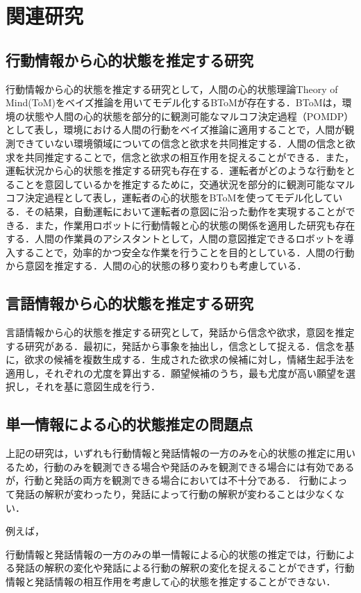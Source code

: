 \chapter{関連研究}
\section{行動情報から心的状態を推定する研究}
\par
行動情報から心的状態を推定する研究として，人間の心的状態理論Theory of Mind(ToM)をベイズ推論を用いてモデル化するBToM\cite{baker2011bayesian}が存在する．BToMは，環境の状態や人間の心的状態を部分的に観測可能なマルコフ決定過程（POMDP）として表し，環境における人間の行動をベイズ推論に適用することで，人間が観測できていない環境領域についての信念と欲求を共同推定する．人間の信念と欲求を共同推定することで，信念と欲求の相互作用を捉えることができる．また，運転状況から心的状態を推定する研究\cite{darwish2020learning}も存在する．運転者がどのような行動をとることを意図しているかを推定するために，交通状況を部分的に観測可能なマルコフ決定過程として表し，運転者の心的状態をBToMを使ってモデル化している．その結果，自動運転において運転者の意図に沿った動作を実現することができる．また，作業用ロボットに行動情報と心的状態の関係を適用した研究\cite{inbook}も存在する．人間の作業員のアシスタントとして，人間の意図推定できるロボットを導入することで，効率的かつ安全な作業を行うことを目的としている．人間の行動から意図を推定する．人間の心的状態の移り変わりも考慮している．

\section{言語情報から心的状態を推定する研究}
\par
言語情報から心的状態を推定する研究として，発話から信念や欲求，意図を推定する研究\cite{10.1007/978-3-642-02481-8_4}がある．最初に，発話から事象を抽出し，信念として捉える．信念を基に，欲求の候補を複数生成する．生成された欲求の候補に対し，情緒生起手法\cite{2002}を適用し，それぞれの尤度を算出する．願望候補のうち，最も尤度が高い願望を選択し，それを基に意図生成を行う．

\section{単一情報による心的状態推定の問題点}
\par
上記の研究は，いずれも行動情報と発話情報の一方のみを心的状態の推定に用いるため，行動のみを観測できる場合や発話のみを観測できる場合には有効であるが，行動と発話の両方を観測できる場合においては不十分である．
行動によって発話の解釈が変わったり，発話によって行動の解釈が変わることは少なくない．

例えば，

行動情報と発話情報の一方のみの単一情報による心的状態の推定では，行動による発話の解釈の変化や発話による行動の解釈の変化を捉えることができず，行動情報と発話情報の相互作用を考慮して心的状態を推定することができない．
